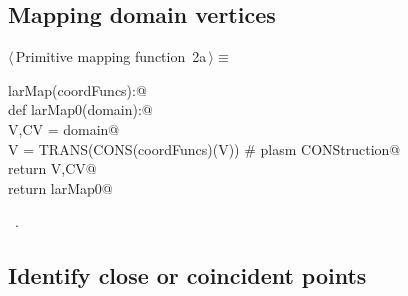 \documentclass[11pt,oneside]{article}	%
\begin{document}
\subsection{Mapping domain vertices}
\begin{flushleft} \small \label{scrap2}
\protect{}$\langle\,$Primitive mapping function\nobreak\ {\footnotesize 2a}$\,\rangle\equiv$
\vspace{-1ex}
\begin{list}{}{} \item
\mbox{}\verb@def larMap(coordFuncs):@\\
\mbox{}\verb@   def larMap0(domain):@\\
\mbox{}\verb@      V,CV = domain@\\
\mbox{}\verb@      V = TRANS(CONS(coordFuncs)(V))  # plasm CONStruction@\\
\mbox{}\verb@      return V,CV@\\
\mbox{}\verb@   return larMap0@\\
\mbox{}\verb@@{\NWsep}
\end{list}
\vspace{-1ex}
\footnotesize\addtolength{\baselineskip}{-1ex}
\begin{list}{}{\setlength{\itemsep}{-\parsep}\setlength{\itemindent}{-\leftmargin}}
\item \NWtxtMacroRefIn\ .
\end{list}
\end{flushleft}

\subsection{Identify close or coincident points}
\end{document}
